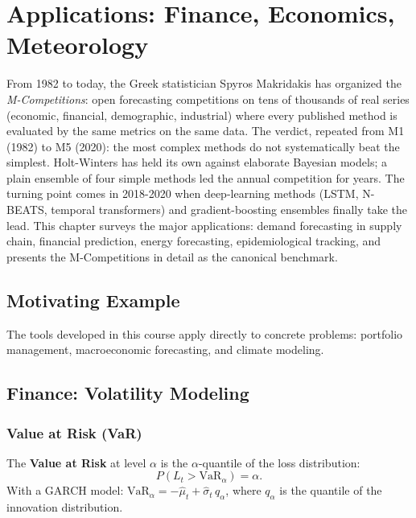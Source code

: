 \chapter{Applications: Finance, Economics, Meteorology}
\label{ch:applications}

From 1982 to today, the Greek statistician Spyros Makridakis has organized the \emph{M-Competitions}: open forecasting competitions on tens of thousands of real series (economic, financial, demographic, industrial) where every published method is evaluated by the same metrics on the same data. The verdict, repeated from M1 (1982) to M5 (2020): the most complex methods do not systematically beat the simplest. Holt-Winters has held its own against elaborate Bayesian models; a plain ensemble of four simple methods led the annual competition for years. The turning point comes in 2018-2020 when deep-learning methods (LSTM, N-BEATS, temporal transformers) and gradient-boosting ensembles finally take the lead. This chapter surveys the major applications: demand forecasting in supply chain, financial prediction, energy forecasting, epidemiological tracking, and presents the M-Competitions in detail as the canonical benchmark.

\section{Motivating Example}
The tools developed in this course apply directly to concrete problems: portfolio management, macroeconomic forecasting, and climate modeling.

\section{Finance: Volatility Modeling}

\subsection{Value at Risk (VaR)}

\begin{definition}[VaR]
The \textbf{Value at Risk} at level $\alpha$ is the $\alpha$-quantile of the loss distribution:
\[
P(L_t > \text{VaR}_\alpha) = \alpha.
\]
With a GARCH model: $\text{VaR}_\alpha = -\hat\mu_t + \hat\sigma_t\,q_\alpha$, where $q_\alpha$ is the quantile of the innovation distribution.
\end{definition}

